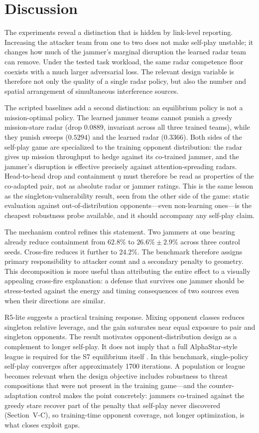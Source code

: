 \section{Discussion}
The experiments reveal a distinction that is hidden by link-level reporting. Increasing the attacker team from one to two does not make self-play unstable; it changes how much of the jammer's marginal disruption the learned radar team can remove. Under the tested task workload, the same radar competence floor coexists with a much larger adversarial loss. The relevant design variable is therefore not only the quality of a single radar policy, but also the number and spatial arrangement of simultaneous interference sources.

The scripted baselines add a second distinction: an equilibrium policy is not a mission-optimal policy. The learned jammer teams cannot punish a greedy mission-stare radar (drop $0.0889$, invariant across all three trained teams), while they punish sweeps ($0.5294$) and the learned radar ($0.3366$). Both sides of the self-play game are specialized to the training opponent distribution: the radar gives up mission throughput to hedge against its co-trained jammer, and the jammer's disruption is effective precisely against attention-spreading radars. Head-to-head drop and containment $\eta$ must therefore be read as properties of the co-adapted pair, not as absolute radar or jammer ratings. This is the same lesson as the singleton-vulnerability result, seen from the other side of the game: static evaluation against out-of-distribution opponents---even non-learning ones---is the cheapest robustness probe available, and it should accompany any self-play claim.

The mechanism control refines this statement. Two jammers at one bearing already reduce containment from $62.8\%$ to $26.6\%\pm2.9\%$ across three control seeds. Cross-fire reduces it further to $24.2\%$. The benchmark therefore assigns primary responsibility to attacker count and a secondary penalty to geometry. This decomposition is more useful than attributing the entire effect to a visually appealing cross-fire explanation: a defense that survives one jammer should be stress-tested against the energy and timing consequences of two sources even when their directions are similar.

R5-lite suggests a practical training response. Mixing opponent classes reduces singleton relative leverage, and the gain saturates near equal exposure to pair and singleton opponents. The result motivates opponent-distribution design as a complement to longer self-play. It does not imply that a full AlphaStar-style league is required for the S7 equilibrium itself \cite{vinyals2019alphastar}. In this benchmark, single-policy self-play converges after approximately 1700 iterations. A population or league becomes relevant when the design objective includes robustness to threat compositions that were not present in the training game---and the counter-adaptation control makes the point concretely: jammers co-trained against the greedy stare recover part of the penalty that self-play never discovered (Section~V-C), so training-time opponent coverage, not longer optimization, is what closes exploit gaps.

